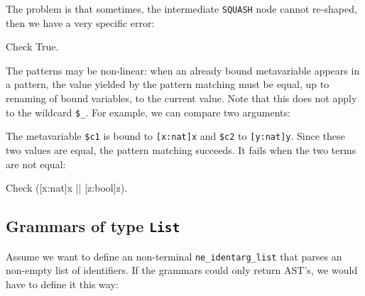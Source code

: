
\noindent The problem is that sometimes, the intermediate {\tt SQUASH}
node cannot re-shaped, then we have a very specific error:

\begin{coq_example}
Check {True}.
\end{coq_example}



The patterns may be non-linear: when an already bound metavariable
appears in a pattern, the value yielded by the pattern matching must
be equal, up to renaming of bound variables, to the current
value. Note that this does not apply to the wildcard \verb+$_+. For
example, we can compare two arguments:


\noindent The metavariable \verb+$c1+ is bound to \verb+[x:nat]x+ and
\verb+$c2+ to \verb+[y:nat]y+. Since these two values are equal, the
pattern matching succeeds. It fails when the two terms are not equal:

\begin{coq_example}
Check ([x:nat]x || [z:bool]z).
\end{coq_example}



\subsection{Grammars of type {\tt List}}

Assume we want to define an non-terminal {\tt ne\_identarg\_list} that
parses an non-empty list of identifiers. If the grammars could only
return AST's, we would have to define it this way:

